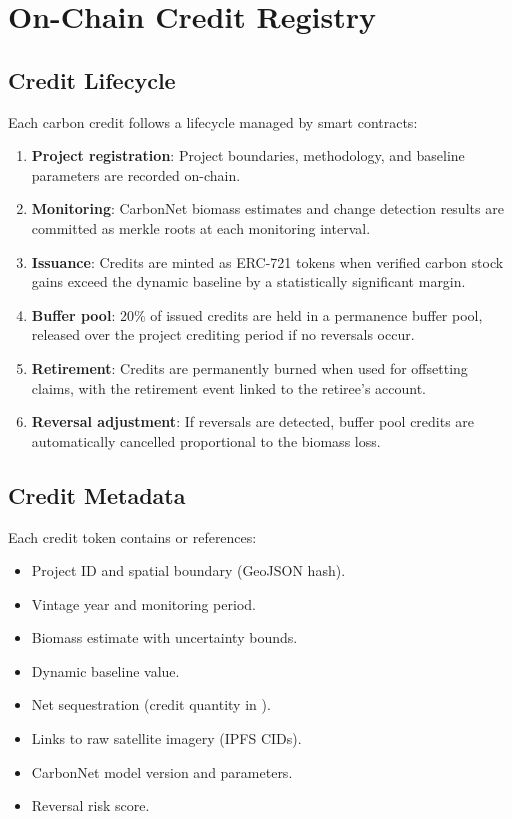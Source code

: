 \section{On-Chain Credit Registry}

\label{sec:registry}

\subsection{Credit Lifecycle}

Each carbon credit follows a lifecycle managed by smart contracts:

\begin{enumerate}
  \item \textbf{Project registration}: Project boundaries, methodology,
    and baseline parameters are recorded on-chain.
  \item \textbf{Monitoring}: CarbonNet biomass estimates and change
    detection results are committed as merkle roots at each monitoring
    interval.
  \item \textbf{Issuance}: Credits are minted as ERC-721 tokens when
    verified carbon stock gains exceed the dynamic baseline by a
    statistically significant margin.
  \item \textbf{Buffer pool}: 20\% of issued credits are held in a
    permanence buffer pool, released over the project crediting period
    if no reversals occur.
  \item \textbf{Retirement}: Credits are permanently burned when used
    for offsetting claims, with the retirement event linked to the
    retiree's account.
  \item \textbf{Reversal adjustment}: If reversals are detected, buffer
    pool credits are automatically cancelled proportional to the
    biomass loss.
\end{enumerate}

\subsection{Credit Metadata}

Each credit token contains or references:
\begin{itemize}
  \item Project ID and spatial boundary (GeoJSON hash).
  \item Vintage year and monitoring period.
  \item Biomass estimate with uncertainty bounds.
  \item Dynamic baseline value.
  \item Net sequestration (credit quantity in \tCO{}).
  \item Links to raw satellite imagery (IPFS CIDs).
  \item CarbonNet model version and parameters.
  \item Reversal risk score.
\end{itemize}

